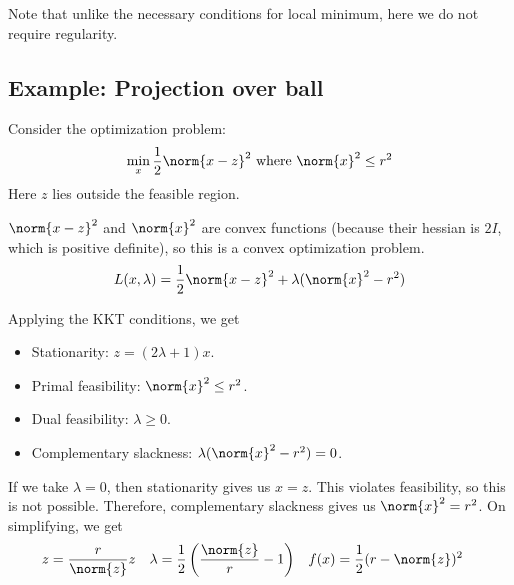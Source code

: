 Note that unlike the necessary conditions for local minimum,
here we do not require regularity.

\subsection{Example: Projection over ball}

Consider the optimization problem:
\[ \min_x \frac{1}{2} \norm{x-z}^2 \textrm{ where } \norm{x}^2 \le r^2 \]
Here $z$ lies outside the feasible region.

$\norm{x-z}^2$ and $\norm{x}^2$ are convex functions
(because their hessian is $2I$, which is positive definite),
so this is a convex optimization problem.
\[ L(x, \lambda) = \frac{1}{2}\norm{x-z}^2 + \lambda(\norm{x}^2 - r^2) \]

Applying the KKT conditions, we get
\begin{itemize}
\item Stationarity: $z = (2\lambda + 1)x$.
\item Primal feasibility: $\norm{x}^2 \le r^2$.
\item Dual feasibility: $\lambda \ge 0$.
\item Complementary slackness: $\lambda(\norm{x}^2 - r^2) = 0$.
\end{itemize}

If we take $\lambda = 0$, then stationarity gives us $x = z$.
This violates feasibility, so this is not possible.
Therefore, complementary slackness gives us $\norm{x}^2 = r^2$.
On simplifying, we get
\begin{align*}
z &= \frac{r}{\norm{z}}z
& \lambda &= \frac{1}{2}\left(\frac{\norm{z}}{r}-1\right)
& f(x) &= \frac{1}{2}(r - \norm{z})^2
\end{align*}


